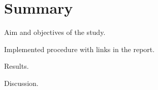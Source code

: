 
\section{Summary}

Aim and objectives of the study.

Implemented procedure with links in the report.

Results.

Discussion.




















\newpage

